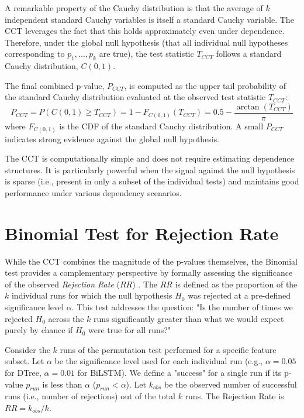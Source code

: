 \begin{appendices}
  A remarkable property of the Cauchy distribution is that the average of $k$ independent standard Cauchy variables is itself a standard Cauchy variable. The CCT leverages the fact that this holds approximately even under dependence. Therefore, under the global null hypothesis (that all individual null hypotheses corresponding to $p_1, ..., p_k$ are true), the test statistic $T_{CCT}$ follows a standard Cauchy distribution, $C(0,1)$.

  The final combined p-value, $P_{CCT}$, is computed as the upper tail probability of the standard Cauchy distribution evaluated at the observed test statistic $T_{CCT}$:
  \begin{equation}
    P_{CCT} = P(C(0,1) \ge T_{CCT}) = 1 - F_{C(0,1)}(T_{CCT}) = 0.5 - \frac{\arctan(T_{CCT})}{\pi}
    \label{eq:cct_pvalue}
  \end{equation}
  where $F_{C(0,1)}$ is the CDF of the standard Cauchy distribution. A small $P_{CCT}$ indicates strong evidence against the global null hypothesis.

  The CCT is computationally simple and does not require estimating dependence structures. It is particularly powerful when the signal against the null hypothesis is sparse (i.e., present in only a subset of the individual tests) and maintains good performance under various dependency scenarios.

  \section{Binomial Test for Rejection Rate}
  \label{sec:binom_test_methodology}

  While the CCT combines the magnitude of the p-values themselves, the Binomial test provides a complementary perspective by formally assessing the significance of the observed \textit{Rejection Rate} ($RR$) \autocite{fahrmeir2016statistik}. The $RR$ is defined as the proportion of the $k$ individual runs for which the null hypothesis $H_0$ was rejected at a pre-defined significance level $\alpha$.
  This test addresses the question: "Is the number of times we rejected $H_0$ across the $k$ runs significantly greater than what we would expect purely by chance if $H_0$ were true for all runs?"

  Consider the $k$ runs of the permutation test performed for a specific feature subset. Let $\alpha$ be the significance level used for each individual run (e.g., $\alpha=0.05$ for DTree, $\alpha=0.01$ for BiLSTM). We define a "success" for a single run if its p-value $p_{run}$ is less than $\alpha$ ($p_{run} < \alpha$). Let $k_{obs}$ be the observed number of successful runs (i.e., number of rejections) out of the total $k$ runs. The Rejection Rate is $RR = k_{obs}/k$.


\end{appendices}
